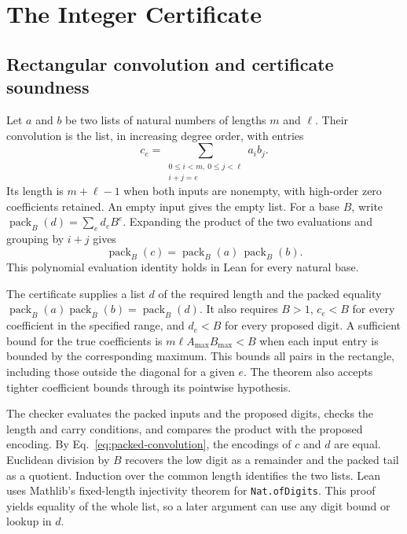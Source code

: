 \documentclass[sigplan,10pt,anonymous,review,balance=false]{acmart}
\newcommand{\pack}{\operatorname{pack}}
\newcommand{\leanid}[1]{\texttt{#1}}
\begin{document}
\section{The Integer Certificate}
\label{sec:packing}

\subsection{Rectangular convolution and certificate soundness}

Let $a$ and $b$ be two lists of natural numbers of lengths $m$ and
$\ell$. Their convolution is the list, in increasing degree order,
with entries
\begin{equation}
 c_e = \sum_{\substack{0\le i<m,\ 0\le j<\ell\\ i+j=e}} a_i b_j .
 \label{eq:convolution}
\end{equation}
Its length is $m+\ell-1$ when both inputs are nonempty, with
high-order zero coefficients retained. An empty input gives the empty
list. For a base $B$, write $\pack_B(d)=\sum_e d_e B^e$.
Expanding the product of the two evaluations and grouping by $i+j$
gives
\begin{equation}
 \pack_B(c)=\pack_B(a)\,\pack_B(b).
 \label{eq:packed-convolution}
\end{equation}
This polynomial evaluation identity holds in Lean for every natural
base.

The certificate supplies a list $d$ of the required length and the
packed equality $\pack_B(a)\pack_B(b)=\pack_B(d)$. It also requires
$B>1$, $c_e<B$ for every coefficient in the specified range, and
$d_e<B$ for every proposed digit. A sufficient bound for the true
coefficients is $m\ell A_{\max}B_{\max}<B$ when each input entry is
bounded by the corresponding maximum. This bounds all pairs in the
rectangle, including those outside the diagonal for a given $e$.
The theorem also accepts tighter coefficient bounds through its
pointwise hypothesis.

The checker evaluates the packed inputs and the proposed digits,
checks the length and carry conditions, and compares the product
with the proposed encoding. By Eq.~\eqref{eq:packed-convolution},
the encodings of $c$ and $d$ are equal. Euclidean division by $B$
recovers the low digit as a remainder and the packed tail as a
quotient. Induction over the common length identifies the two lists.
Lean uses Mathlib's fixed-length injectivity theorem for
\leanid{Nat.ofDigits}. This proof yields equality of the whole list,
so a later argument can use any digit bound or lookup in $d$.
\end{document}
